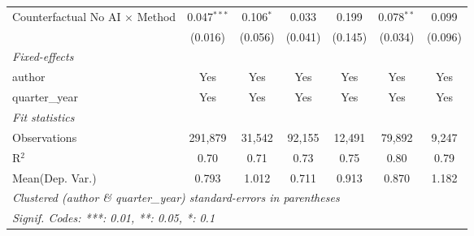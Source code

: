 \begin{tabular}{lcccccc}
   Counterfactual No AI $\times$ Method  & 0.047$^{***}$  & 0.106$^{*}$   & 0.033          & 0.199          & 0.078$^{**}$   & 0.099\\   
                                         & (0.016)        & (0.056)       & (0.041)        & (0.145)        & (0.034)        & (0.096)\\   
   \midrule
   \emph{Fixed-effects}\\
   author                                & Yes            & Yes           & Yes            & Yes            & Yes            & Yes\\  
   quarter\_year                         & Yes            & Yes           & Yes            & Yes            & Yes            & Yes\\  
   \midrule
   \emph{Fit statistics}\\
   Observations                          & 291,879        & 31,542        & 92,155         & 12,491         & 79,892         & 9,247\\  
   R$^2$                                 & 0.70           & 0.71          & 0.73           & 0.75           & 0.80           & 0.79\\  
Mean(Dep. Var.) & 0.793 & 1.012 & 0.711 & 0.913 & 0.870 & 1.182 \\
   \midrule \midrule
   \multicolumn{7}{l}{\emph{Clustered (author \& quarter\_year) standard-errors in parentheses}}\\
   \multicolumn{7}{l}{\emph{Signif. Codes: ***: 0.01, **: 0.05, *: 0.1}}\\
\end{tabular}
\par\endgroup
